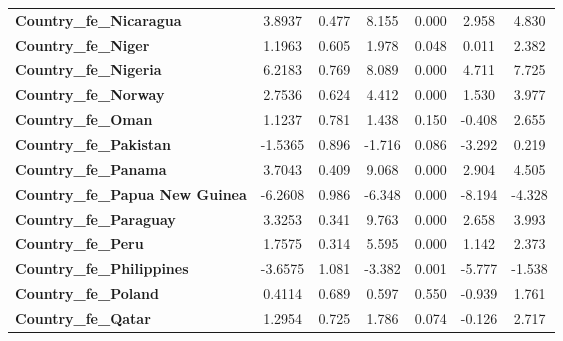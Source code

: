 \begin{center}
\begin{tabular}{lcccccc}
\textbf{Country\_fe\_Nicaragua}                      &       3.8937  &        0.477     &     8.155  &         0.000        &        2.958    &        4.830     \\
\textbf{Country\_fe\_Niger}                          &       1.1963  &        0.605     &     1.978  &         0.048        &        0.011    &        2.382     \\
\textbf{Country\_fe\_Nigeria}                        &       6.2183  &        0.769     &     8.089  &         0.000        &        4.711    &        7.725     \\
\textbf{Country\_fe\_Norway}                         &       2.7536  &        0.624     &     4.412  &         0.000        &        1.530    &        3.977     \\
\textbf{Country\_fe\_Oman}                           &       1.1237  &        0.781     &     1.438  &         0.150        &       -0.408    &        2.655     \\
\textbf{Country\_fe\_Pakistan}                       &      -1.5365  &        0.896     &    -1.716  &         0.086        &       -3.292    &        0.219     \\
\textbf{Country\_fe\_Panama}                         &       3.7043  &        0.409     &     9.068  &         0.000        &        2.904    &        4.505     \\
\textbf{Country\_fe\_Papua New Guinea}               &      -6.2608  &        0.986     &    -6.348  &         0.000        &       -8.194    &       -4.328     \\
\textbf{Country\_fe\_Paraguay}                       &       3.3253  &        0.341     &     9.763  &         0.000        &        2.658    &        3.993     \\
\textbf{Country\_fe\_Peru}                           &       1.7575  &        0.314     &     5.595  &         0.000        &        1.142    &        2.373     \\
\textbf{Country\_fe\_Philippines}                    &      -3.6575  &        1.081     &    -3.382  &         0.001        &       -5.777    &       -1.538     \\
\textbf{Country\_fe\_Poland}                         &       0.4114  &        0.689     &     0.597  &         0.550        &       -0.939    &        1.761     \\
\textbf{Country\_fe\_Qatar}                          &       1.2954  &        0.725     &     1.786  &         0.074        &       -0.126    &        2.717     \\

\end{tabular}
\end{center}
